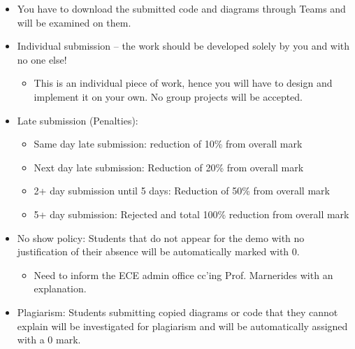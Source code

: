 \documentclass{article}
\begin{document}
\begin{itemize}


    \item You have to download the submitted code and diagrams through Teams and will be examined on them.


    \item Individual submission – the work should be developed solely by you and with no one else!


    \begin{itemize}


        \item This is an individual piece of work, hence you will have to design and implement it on your own. No group projects will be accepted.


    \end{itemize}


    \item Late submission (Penalties):


    \begin{itemize}


        \item Same day late submission: reduction of 10\% from overall mark


        \item Next day late submission: Reduction of 20\% from overall mark


        \item 2+ day submission until 5 days: Reduction of 50\% from overall mark


        \item 5+ day submission: Rejected and total 100\% reduction from overall mark


    \end{itemize}


    \item No show policy: Students that do not appear for the demo with no justification of their absence will be automatically marked with 0.


    \begin{itemize}


        \item Need to inform the ECE admin office cc’ing Prof. Marnerides with an explanation.


    \end{itemize}


    \item Plagiarism: Students submitting copied diagrams or code that they cannot explain will be investigated for plagiarism and will be automatically assigned with a 0 mark.



\end{itemize}
\end{document}
